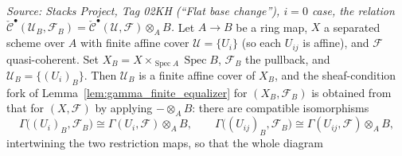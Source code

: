 \begin{lemma}
  \label{lem:base_changed_equalizer_diagram}
  \textit{Source: Stacks Project, Tag 02KH (``Flat base change''), $i=0$ case,
  the relation \(\check{\mathcal{C}}^\bullet(\mathcal{U}_B,\mathcal{F}_B) =
  \check{\mathcal{C}}^\bullet(\mathcal{U},\mathcal{F}) \otimes_A B\).}
  Let \(A \to B\) be a ring map, \(X\) a separated scheme over \(A\) with finite
  affine cover \(\mathcal{U} = \{U_i\}\) (so each \(U_{ij}\) is affine), and
  \(\mathcal{F}\) quasi-coherent. Set \(X_B = X \times_{\operatorname{Spec} A}
  \operatorname{Spec} B\), \(\mathcal{F}_B\) the pullback, and
  \(\mathcal{U}_B = \{(U_i)_B\}\). Then \(\mathcal{U}_B\) is a finite affine cover of
  \(X_B\), and the sheaf-condition fork of Lemma~\ref{lem:gamma_finite_equalizer} for
  \((X_B, \mathcal{F}_B)\) is obtained from that for \((X, \mathcal{F})\) by applying
  \(- \otimes_A B\): there are compatible isomorphisms
  \[
    \Gamma\bigl((U_i)_B, \mathcal{F}_B\bigr) \cong \Gamma(U_i, \mathcal{F}) \otimes_A B,
    \qquad
    \Gamma\bigl((U_{ij})_B, \mathcal{F}_B\bigr) \cong \Gamma(U_{ij}, \mathcal{F}) \otimes_A B,
  \]
  intertwining the two restriction maps, so that the whole diagram

\end{lemma}

